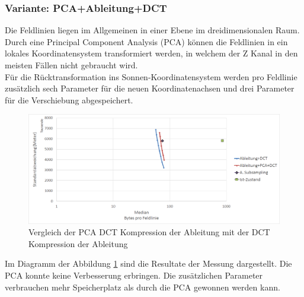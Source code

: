 \subsubsection{Variante: PCA+Ableitung+DCT}
Die Feldlinien liegen im Allgemeinen in einer Ebene im dreidimensionalen Raum. Durch eine Principal Component Analysis (PCA)\cite{abdi2010principal} können die Feldlinien in ein lokales Koordinatensystem transformiert werden, in welchem der Z Kanal in den meisten Fällen nicht gebraucht wird.\\
Für die Rücktransformation ins Sonnen-Koordinatensystem werden pro Feldlinie zusätzlich sech Parameter für die neuen Koordinatenachsen und drei Parameter für die Verschiebung abgespeichert.
\begin{figure}[!htbp]
	\center
	\includegraphics[width=1\textwidth,keepaspectratio]{./pictures/resultate/loesung1/loesung1-4/loesung1_4.png}
	\caption{Vergleich der PCA DCT Kompression der Ableitung mit der DCT Kompression der Ableitung}
	\label{resultate:loesung1:dct:pca}
\end{figure}
Im Diagramm der Abbildung \ref{resultate:loesung1:dct:pca} sind die Resultate der Messung dargestellt. Die PCA konnte keine Verbesserung erbringen. Die zusätzlichen Parameter verbrauchen mehr Speicherplatz als durch die PCA gewonnen werden kann.

